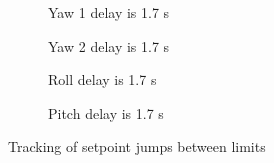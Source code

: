 %




\begin{figure}
	\begin{subfigure}[b]{0.5\textwidth}
		\centering
		\resizebox{\linewidth}{!}{
			
		}
		\caption{Yaw 1 delay is 1.7 s}
	\end{subfigure}
	\begin{subfigure}[b]{0.5\textwidth}
		\centering
		\resizebox{\linewidth}{!}{
			
		}
		\caption{Yaw 2 delay is 1.7 s}
	\end{subfigure}
	\begin{subfigure}[b]{0.5\textwidth}
		\centering
		\resizebox{\linewidth}{!}{
			
		}
		\caption{Roll delay is 1.7 s}
	\end{subfigure}
	\begin{subfigure}[b]{0.5\textwidth}
		\centering
		\resizebox{\linewidth}{!}{
			
		}
		\caption{Pitch delay is 1.7 s}
	\end{subfigure}
	\caption{Tracking of setpoint jumps between limits}
	\label{square_excite}
\end{figure}

